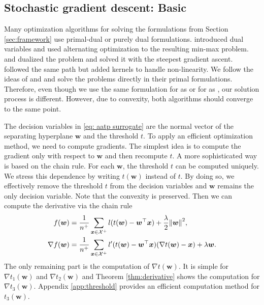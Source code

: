 \subsection{Stochastic gradient descent: Basic}

Many optimization algorithms for solving the formulations from Section \ref{sec:framework} use primal-dual or purely dual formulations. \cite{eban2017scalable} introduced dual variables and used alternating optimization to the resulting min-max problem.  \cite{li2014top} and \cite{zhang2018tau} dualized the problem and solved it with the steepest gradient ascent. \cite{macha2020nonlinear} followed the same path but added kernels to handle non-linearity. We follow the ideas of \cite{mackey2018constrained} and \cite{adam2019machine} and solve the problems directly in their primal formulations. Therefore, even though we use the same formulation for \TopPush as \cite{li2014top} or for \tauFPL as \cite{zhang2018tau}, our solution process is different. However, due to convexity, both algorithms should converge to the same point.

The decision variables in \eqref{eq: aatp surrogate} are the normal vector of the separating hyperplane $\bm{w}$ and the threshold $t$. To apply an efficient optimization method, we need to compute gradients. The simplest idea \cite{grill2016learning} is to compute the gradient only with respect to $\bm{w}$ and then recompute $t$. A more sophisticated way is based on the chain rule. For each $\bm{w}$, the threshold $t$ can be computed uniquely. We stress this dependence by writing $t(\bm{w})$ instead of $t$. By doing so, we effectively remove the threshold $t$ from the decision variables and $\bm{w}$ remains the only decision variable. Note that the convexity is preserved. Then we can compute the derivative via the chain rule
\begin{equation}\label{eq:derivatives}
  \begin{aligned}
  f(\bm{w}) & = \frac{1}{n^+}\sum_{\bm{x} \in \Xc^+} l(t(\bm{w}) - \bm{w}^\top \bm{x}) + \frac{\lambda}{2}\norm{\bm{w}}^2, \\
  \nabla f(\bm{w}) & = \frac{1}{n^+}\sum_{\bm{x} \in \Xc^+} l'(t(\bm{w}) - \bm{w}^\top \bm{x})(\nabla t(\bm{w}) - \bm{x}) + \lambda \bm{w}.
  \end{aligned}
\end{equation}
The only remaining part is the computation of $\nabla t(\bm{w})$. It is simple for $\nabla t_1(\bm{w})$ and $\nabla t_2(\bm{w})$ and Theorem \ref{thm:derivative} shows the computation for $\nabla t_3(\bm{w})$. Appendix \ref{app:threshold} provides an efficient computation method for $t_3(\bm{w})$.

